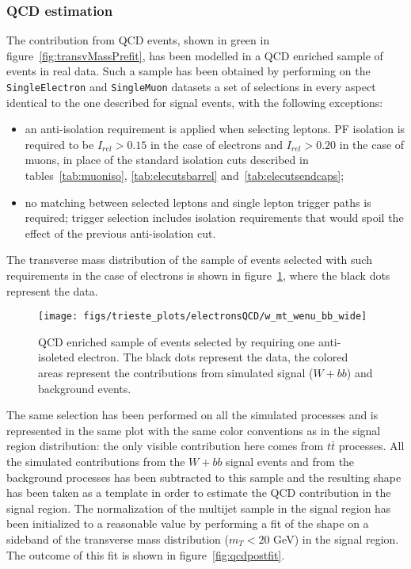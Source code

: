 \subsubsection{QCD estimation}
\label{sec:qcd}

The contribution from QCD events, shown in green in figure~\ref{fig:transvMassPrefit},
has been modelled in a QCD enriched sample of events in real data.
Such a sample has been obtained by performing on the \texttt{SingleElectron} and 
\texttt{SingleMuon} datasets a set of selections in every aspect identical to the 
one described for signal events, with the following exceptions:
\begin{itemize}
  \item an anti-isolation requirement is applied when selecting leptons.
    PF isolation is required to be $I_{rel} > 0.15$ in the case of electrons 
    and $I_{rel} > 0.20$ in the case of muons, in place of the standard isolation 
    cuts described in tables~\ref{tab:muoniso}, \ref{tab:elecutsbarrel} and~\ref{tab:elecutsendcaps};
  \item no matching between selected leptons and single lepton trigger 
    paths is required; trigger selection includes isolation requirements that 
    would spoil the effect of the previous anti-isolation cut.
\end{itemize}
The transverse mass distribution of the sample of events selected with such requirements
in the case of electrons
is shown in figure~\ref{fig:qcdprefit}, where the black dots represent the data.


\begin{figure}[htb]
	\begin{center}
		\leavevmode
		\texttt{[image: figs/trieste\_plots/electronsQCD/w\_mt\_wenu\_bb\_wide]}
	\end{center}
	\caption{QCD enriched sample of events selected by requiring one anti-isoleted electron.
        The black dots represent the data, the colored areas represent the contributions 
        from simulated signal ($W + bb$) and background events.}
	\label{fig:qcdprefit}
\end{figure}

The same selection has been performed on all the simulated processes 
and is represented in the same plot with the same color conventions as in the 
signal region distribution: the only visible contribution here 
comes from $t\bar{t}$ processes. All the simulated contributions from 
the $W + bb$ signal events 
and from the background processes has been subtracted to this sample and the resulting 
shape has been taken as a template in order to estimate the QCD contribution in the 
signal region.
The normalization of the multijet sample in the signal region has been initialized to 
a reasonable value by performing a fit of the shape
on a sideband of the transverse mass distribution ($m_{T} < 20$ GeV) in the signal
region. The outcome of this fit is shown in figure~\ref{fig:qcdpostfit}.

